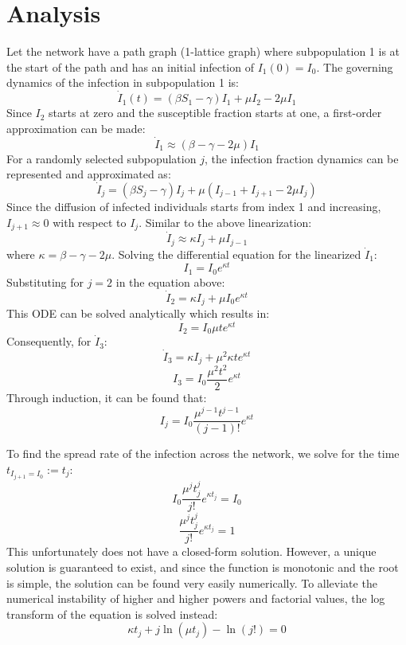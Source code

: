 \documentclass{article}
\begin{document}
\section*{Analysis}

\begin{center}
\end{center}

Let the network have a path graph (1-lattice graph) where subpopulation 1 is at the start of the path and has an initial infection of $I_1(0)=I_0$. The governing dynamics of the infection in subpopulation 1 is:
$$
\dot I_1(t)=(\beta S_1-\gamma)I_1+\mu I_2-2\mu I_1
$$
Since $I_2$ starts at zero and the susceptible fraction starts at one, a first-order approximation can be made:
$$
\dot I_1 \approx (\beta-\gamma-2\mu)I_1
$$
For a randomly selected subpopulation $j$, the infection fraction dynamics can be represented and approximated as:
$$
\dot I_j =(\beta S_j-\gamma)I_j+\mu (I_{j-1}+I_{j+1}-2\mu I_j)
$$
Since the diffusion of infected individuals starts from index 1 and increasing, $I_{j+1} \approx 0$ with respect to $I_j$. Similar to the above linearization:
$$
\dot I_j \approx \kappa I_j+\mu I_{j-1}
$$
where $\kappa = \beta-\gamma-2\mu$. Solving the differential equation for the linearized $\dot I_1$:
$$
I_1 = I_0 e^{\kappa t}
$$
Substituting for $j=2$ in the equation above:
$$
\dot I_2=\kappa I_j +\mu I_0 e^{\kappa t}
$$
This ODE can be solved analytically which results in:
$$
I_2=I_0 \mu t e^{\kappa t}  
$$
Consequently, for $\dot I_3$:
$$
\dot I_3=\kappa I_j +\mu^2 \kappa t e^{\kappa t}
$$
$$
I_3 = I_0 \frac{\mu^2 t^2}{2} e^{\kappa t}
$$
Through induction, it can be found that:
$$
I_j=I_0 \frac{\mu^{j-1} t^{j-1}}{(j-1)!} e^{\kappa t}
$$

To find the spread rate of the infection across the network, we solve for the time $t_{I_{j+1}=I_0} :=t_j$:
$$
I_0 \frac{\mu^{j} t_j^{j}}{j!} e^{\kappa t_j} = I_0
$$
$$
\frac{\mu^{j} t_j^{j}}{j!} e^{\kappa t_j} = 1 
$$
This unfortunately does not have a closed-form solution. However, a unique solution is guaranteed to exist, and since the function is monotonic and the root is simple, the solution can be found very easily numerically. To alleviate the numerical instability of higher and higher powers and factorial values, the log transform of the equation is solved instead:
$$
\kappa t_j + j \ln(\mu t_j) - \ln(j!) = 0
$$
\end{document}
